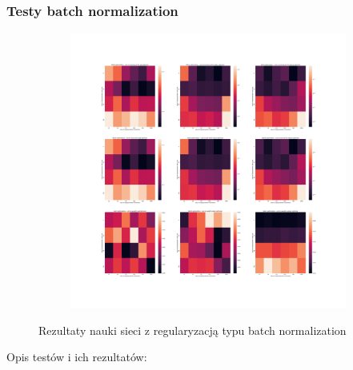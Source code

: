 \documentclass[12pt]{article}
\begin{document}
\subsubsection{Testy batch normalization}
\begin{figure}[h!]
	\centering
	\begin{subfigure}[b]{1\linewidth}
		\includegraphics[width=\linewidth]{Comparision_batch_norm.png}
	\end{subfigure}
	\label{fig:batch}
	\caption{Rezultaty nauki sieci z regularyzacją typu batch normalization}
\end{figure}
Opis testów i ich rezultatów:
\end{document}
